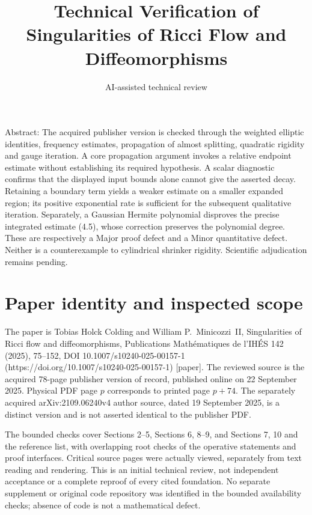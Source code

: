 \documentclass[10pt]{article}
\title{Technical Verification of
Singularities of Ricci Flow and Diffeomorphisms}
\author{AI-assisted technical review}
\date{}
\begin{document}
\maketitle
Abstract: The acquired publisher version is checked through the weighted elliptic identities, frequency estimates, propagation of almost splitting, quadratic rigidity and gauge iteration. A core propagation argument invokes a relative endpoint estimate without establishing its required hypothesis. A scalar diagnostic confirms that the displayed input bounds alone cannot give the asserted decay. Retaining a boundary term yields a weaker estimate on a smaller expanded region; its positive exponential rate is sufficient for the subsequent qualitative iteration. Separately, a Gaussian Hermite polynomial disproves the precise integrated estimate (4.5), whose correction preserves the polynomial degree. These are respectively a Major proof defect and a Minor quantitative defect. Neither is a counterexample to cylindrical shrinker rigidity. Scientific adjudication remains pending.\par
\section*{Paper identity and inspected scope}
The paper is Tobias Holck Colding and William P. Minicozzi II, Singularities of Ricci flow and diffeomorphisms, Publications Mathématiques de l’IHÉS 142 (2025), 75–152, DOI 10.1007/s10240-025-00157-1 (https://doi.org/10.1007/s10240-025-00157-1) [paper]. The reviewed source is the acquired 78-page publisher version of record, published online on 22 September 2025. Physical PDF page \(p\) corresponds to printed page \(p+74\). The separately acquired arXiv:2109.06240v4 author source, dated 19 September 2025, is a distinct version and is not asserted identical to the publisher PDF.\par
The bounded checks cover Sections 2–5, Sections 6, 8–9, and Sections 7, 10 and the reference list, with overlapping root checks of the operative statements and proof interfaces. Critical source pages were actually viewed, separately from text reading and rendering. This is an initial technical review, not independent acceptance or a complete reproof of every cited foundation. No separate supplement or original code repository was identified in the bounded availability checks; absence of code is not a mathematical defect.\par
\end{document}
